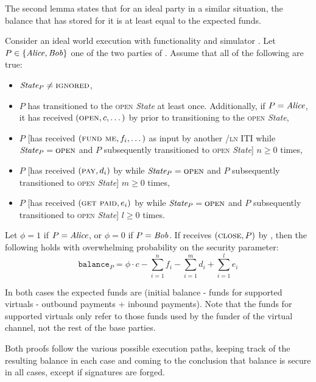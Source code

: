   The second lemma states that for an ideal party in a
  similar situation, the balance that \fchan has stored for it is at least equal
  to the expected funds.

\begin{lemma}
\label{lemma:ideal-balance}
  Consider an ideal world execution with functionality \fchan and simulator
  \simulator. Let $P \in \{\mathit{Alice}, \mathit{Bob}\}$ one of the two parties of \fchan.
  Assume that all of the following are true:
  \begin{itemize}
    \item $\itistate_P \neq \textsc{ignored}$,
    \item $P$ has transitioned to the \textsc{open} \textit{State} at least
    once. Additionally, if $P = \mathit{Alice}$, it has received $(\textsc{open}, c,
    \dots)$ by \environment prior to transitioning to the \textsc{open}
    \textit{State},
    \item $P$ [has received $(\textsc{fund me}, f_i, \dots)$ as input by another
    \fchan/\textsc{ln} ITI while $\itistate_P = \textsc{open}$ and $P$
    subsequently transitioned to \textsc{open} \textit{State}] $n \geq 0$ times,
    \item $P$ [has received $(\textsc{pay}, d_i)$ by \environment while
    $\itistate_P = \textsc{open}$ and $P$ subsequently transitioned to
    \textsc{open} \textit{State}] $m \geq 0$ times,
    \item $P$ [has received $(\textsc{get paid}, e_i)$ by \environment while
    $\itistate_P = \textsc{open}$ and $P$ subsequently transitioned to
    \textsc{open} \textit{State}] $l \geq 0$ times.
  \end{itemize}
  Let $\phi = 1$ if $P = \mathit{Alice}$, or $\phi = 0$ if $P = \mathit{Bob}$. If \fchan
  receives $(\textsc{close}, P)$ by \simulator, then the following holds with
  overwhelming probability on the security parameter:
  \begin{equation}
    \texttt{balance}_P = \phi \cdot c - \sum\limits_{i=1}^n f_i -
    \sum\limits_{i=1}^m d_i + \sum\limits_{i=1}^l e_i
  \end{equation}
\end{lemma}

  In both cases the expected funds are (initial balance -
  funds for supported virtuals - outbound payments + inbound payments). Note
  that the funds for supported virtuals only refer to those funds used by the
  funder of the virtual channel, not the rest of the base parties.

  Both proofs follow the various possible execution paths, keeping track of the
  resulting balance in each case and coming to the conclusion that balance is
  secure in all cases, except if signatures are forged.

